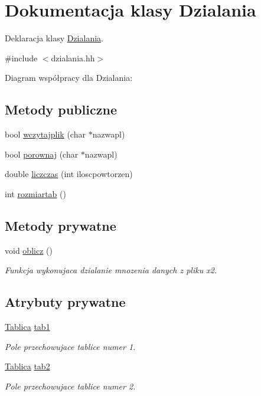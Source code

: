 \hypertarget{class_dzialania}{\section{Dokumentacja klasy Dzialania}
\label{class_dzialania}
}


Deklaracja klasy \hyperlink{class_dzialania}{Dzialania}.  




{\ttfamily \#include $<$dzialania.\-hh$>$}



Diagram współpracy dla Dzialania\-:
\subsection*{Metody publiczne}
\begin{DoxyCompactItemize}
\item 
bool \hyperlink{class_dzialania_a4d1a1b41a0f2f76d4c16ad20f77b7cfa}{wczytajplik} (char $\ast$nazwapl)
\item 
bool \hyperlink{class_dzialania_af059b80e034854eb1ae878d6b636fff6}{porownaj} (char $\ast$nazwapl)
\item 
double \hyperlink{class_dzialania_a8c13fb89281d74f9dd8dd22f43bffbb9}{liczczas} (int iloscpowtorzen)
\item 
int \hyperlink{class_dzialania_a177e69d16b8280aae1d658adb67a8fbc}{rozmiartab} ()
\end{DoxyCompactItemize}
\subsection*{Metody prywatne}
\begin{DoxyCompactItemize}
\item 
void \hyperlink{class_dzialania_a5e82b0cea1d28ce02b6968071c1d20e5}{oblicz} ()
\begin{DoxyCompactList}\small\item\em Funkcja wykonujaca dzialanie mnozenia danych z pliku x2. \end{DoxyCompactList}\end{DoxyCompactItemize}
\subsection*{Atrybuty prywatne}
\begin{DoxyCompactItemize}
\item 
\hyperlink{class_tablica}{Tablica} \hyperlink{class_dzialania_aa1cf12383b1e7fe159856ff7a29216fc}{tab1}
\begin{DoxyCompactList}\small\item\em Pole przechowujace tablice numer 1. \end{DoxyCompactList}\item 
\hyperlink{class_tablica}{Tablica} \hyperlink{class_dzialania_a63fcc04c8e704850ceec908ed61b408a}{tab2}
\begin{DoxyCompactList}\small\item\em Pole przechowujace tablice numer 2. \end{DoxyCompactList}\end{DoxyCompactItemize}


